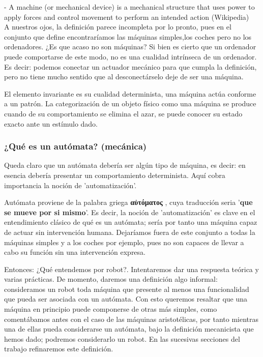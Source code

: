 - A machine (or mechanical device) is a mechanical structure that uses power to apply forces and control movement to perform an intended action (Wikipedia) \\

A nuestros ojos, la definición parece incompleta por lo pronto, pues en el conjunto que define encontraríamos las máquinas simples,los coches pero no los ordenadores. ¿Es que acaso no son máquinas? Si bien es cierto que un ordenador puede comportarse de este modo, no es una cualidad intrínseca de un ordenador. Es decir: podemos conectar un actuador mecánico para que cumpla la definición, pero no tiene mucho sentido que al desconectárselo deje de ser una máquina. 

\vspace{10px}

El elemento invariante es su cualidad determinista, una máquina actúa conforme a un patrón. La categorización de un objeto físico como una máquina se produce cuando de su comportamiento se elimina el azar, se puede conocer su estado exacto ante un estímulo dado.



\subsubsection{¿Qué es un autómata? (mecánica)}

Queda claro que un autómata debería ser algún tipo de máquina, es decir: en esencia debería presentar un comportamiento determinista. Aquí cobra importancia la noción de 'automatización'.

\vspace{10px}

Autómata proviene de la palabra griega \textbf{\textgreek{αὐτόματος}} , cuya traducción seria '\textbf{que se mueve por si mismo}'. Es decir, la noción de 'automatización' es clave en el entendimiento clásico de  qué es un autómata; sería por tanto una máquina capaz de actuar sin intervención humana. Dejaríamos fuera de este conjunto a todas la máquinas simples y a los coches por ejemplo, pues no son capaces de llevar a cabo su función sin una intervención expresa.

\vspace{10px}

Entonces: ¿Qué entendemos por robot?. Intentaremos dar una respuesta teórica y varias prácticas. De momento, daremos una definición algo informal: consideramos un robot toda máquina que presente al menos una funcionalidad que pueda ser asociada con un autómata. Con esto queremos resaltar que una máquina en principio puede componerse de otras más simples, como comentábamos antes con el caso de las máquinas aristotélicas, por tanto mientras una de ellas pueda considerarse un autómata, bajo la definición mecanicista que hemos dado; podremos considerarlo un robot. En las sucesivas secciones del trabajo refinaremos este definición.

\newpage
